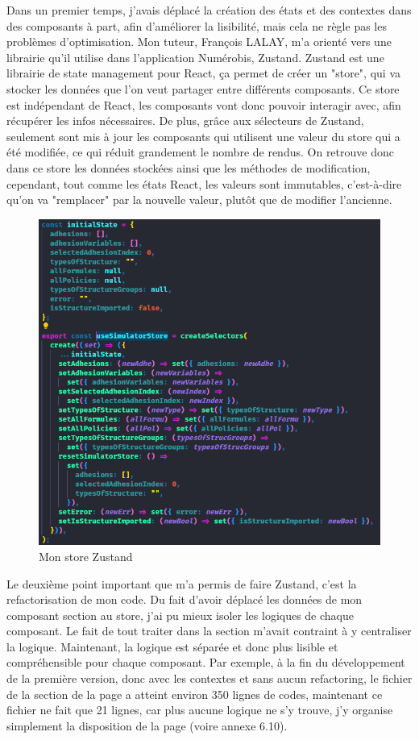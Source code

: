 \documentclass[a4paper,12pt]{report}
\begin{document}
Dans un premier temps, j'avais déplacé la création des états et des contextes dans des composants à part, afin d'améliorer la lisibilité, mais cela ne règle pas les problèmes d'optimisation. Mon tuteur, François LALAY, m'a orienté vers une librairie qu'il utilise dans l'application Numérobis, Zustand. Zustand est une librairie de state management pour React, ça permet de créer un "store", qui va stocker les données que l'on veut partager entre différents composants. Ce store est indépendant de React, les composants vont donc pouvoir interagir avec, afin récupérer les infos nécessaires. De plus, grâce aux sélecteurs de Zustand, seulement sont mis à jour les composants qui utilisent une valeur du store qui a été modifiée, ce qui réduit grandement le nombre de rendus. On retrouve donc dans ce store les données stockées ainsi que les méthodes de modification, cependant, tout comme les états React, les valeurs sont immutables, c'est-à-dire qu'on va "remplacer" par la nouvelle valeur, plutôt que de modifier l'ancienne.

\begin{figure}[H]
    \centering
    \includegraphics[scale=0.4]{storeZustand.png}
    \caption{Mon store Zustand}
    \label{fig:store-zustand}
\end{figure}

Le deuxième point important que m'a permis de faire Zustand, c'est la refactorisation de mon code. Du fait d'avoir déplacé les données de mon composant section au store, j'ai pu mieux isoler les logiques de chaque composant. Le fait de tout traiter dans la section m'avait contraint à y centraliser la logique. Maintenant, la logique est séparée et donc plus lisible et compréhensible pour chaque composant. Par exemple, à la fin du développement de la première version, donc avec les contextes et sans aucun refactoring, le fichier de la section de la page a atteint environ 350 lignes de codes, maintenant ce fichier ne fait que 21 lignes, car plus aucune logique ne s'y trouve, j'y organise simplement la disposition de la page (voire annexe 6.10).
\end{document}
